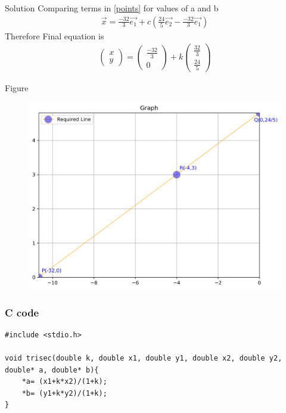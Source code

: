 \documentclass{beamer}
\begin{document}
\begin{frame}{Solution}
Comparing terms in \eqref{points} for values of a and b
\begin{align}
    \vec{x}=\frac{-32}{3}\vec{e_1}+c(\frac{24}{5}\vec{e_2}-\frac{-32}{3}\vec{e_1})
\end{align}
Therefore Final equation is
\begin{align}
\begin{pmatrix}x\\y\end{pmatrix}=\begin{pmatrix}\frac{-32}{3}\\0\end{pmatrix}+k\begin{pmatrix}\frac{32}{3}\\ \frac{24}{5}\end{pmatrix}
\end{align}
\end{frame}
\begin{frame}{Figure}
\begin{figure}[H]
    \centering
    \includegraphics[width=0.9\columnwidth]{figs/figure.png}
    \label{fig:placeholder}
\end{figure}
\end{frame}
\begin{frame}[fragile]
\frametitle{C code}
\begin{lstlisting}
#include <stdio.h>

void trisec(double k, double x1, double y1, double x2, double y2, double* a, double* b){
    *a= (x1+k*x2)/(1+k);
    *b= (y1+k*y2)/(1+k);
}
\end{lstlisting}
\end{frame}
\end{document}
